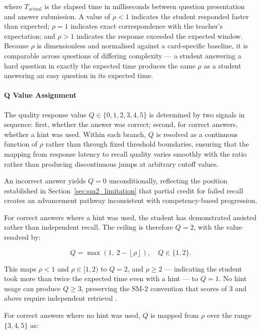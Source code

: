 where $T_{\text{actual}}$ is the elapsed time in milliseconds between question presentation and answer submission. A value of $\rho < 1$ indicates the student responded faster than expected; $\rho = 1$ indicates exact correspondence with the teacher's expectation; and $\rho > 1$ indicates the response exceeded the expected window. Because $\rho$ is dimensionless and normalised against a card-specific baseline, it is comparable across questions of differing complexity — a student answering a hard question in exactly the expected time produces the same $\rho$ as a student answering an easy question in its expected time.

\paragraph{Q Value Assignment}
The quality response value $Q \in \{0, 1, 2, 3, 4, 5\}$ is determined by two signals in sequence: first, whether the answer was correct; second, for correct answers, whether a hint was used. Within each branch, $Q$ is resolved as a continuous function of $\rho$ rather than through fixed threshold boundaries, ensuring that the mapping from response latency to recall quality varies smoothly with the ratio rather than producing discontinuous jumps at arbitrary cutoff values.

An incorrect answer yields $Q = 0$ unconditionally, reflecting the position established in Section~\ref{sec:sm2_limitation} that partial credit for failed recall creates an advancement pathway inconsistent with competency-based progression.

For correct answers where a hint was used, the student has demonstrated assisted rather than independent recall. The ceiling is therefore $Q = 2$, with the value resolved by:

\begin{equation}
Q = \max\!\left(1,\ 
    2 - \left\lfloor \rho \right\rfloor
\right), \quad Q \in \{1, 2\}.
\end{equation}

This maps $\rho < 1$ and $\rho \in [1, 2)$ to $Q = 2$, and $\rho \geq 2$ — indicating the student took more than twice the expected time even with a hint — to $Q = 1$. No hint usage can produce $Q \geq 3$, preserving the SM-2 convention that scores of 3 and above require independent retrieval \cite{wozniak1998sm2}.

For correct answers where no hint was used, $Q$ is mapped from $\rho$ over the range $\{3, 4, 5\}$ as:

